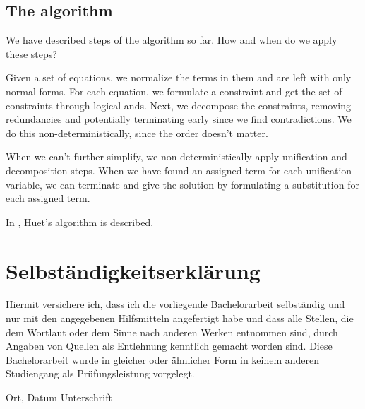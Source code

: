 \documentclass[twoside,12pt,a4paper]{article}
\begin{document}
\subsection{The algorithm}
We have described steps of the algorithm so far. How and when do we apply these steps?

Given a set of equations, we normalize the terms in them and are left with only normal forms. 
For each equation, we formulate a constraint and get the set of constraints through logical ands.
Next, we decompose the constraints, removing redundancies and potentially terminating early since we find contradictions.
We do this non-deterministically, since the order doesn't matter. %

When we can't further simplify, we non-deterministically apply unification and decomposition steps.
When we have found an assigned term for each unification variable, we can terminate and give the solution
by formulating a substitution for each assigned term.


\newpage
In \cite{DBLP:books/el/RV01/Dowek01}, Huet's algorithm is described. %








\cleardoublepage

\thispagestyle{empty}
\section*{Selbständigkeitserklärung}

Hiermit versichere ich, dass ich die vorliegende Bachelorarbeit 
selbständig und nur mit den angegebenen Hilfsmitteln angefertigt habe und dass alle Stellen, die dem Wortlaut oder dem 
Sinne nach anderen Werken entnommen sind, durch Angaben von Quellen als 
Entlehnung kenntlich gemacht worden sind. 
Diese Bachelorarbeit wurde in gleicher oder ähnlicher Form in keinem anderen 
Studiengang als Prüfungsleistung vorgelegt. 

\vskip 3cm

Ort, Datum	\hfill Unterschrift \hfill 


\end{document}
